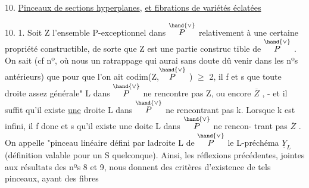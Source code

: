
10. \uline{Pinceaux de sections hyperplanes}, \uline{et fibrations de variétés éclatées}

10. 1. Soit Z l'ensemble P-exceptionnel dans $\overset{\hand{\vee}}{P}$ relativement à une
certaine propriété constructible, de sorte que Z est une partie construc%
tible de $\overset{\hand{\vee}}{P}$ . \hand{(}\hand{)} On sait (cf nº, où nous  un ratrappage
 qui aurai sans doute dû venir dans les nºs antérieurs) que pour que
l'on ait codim(Z,$\overset{\hand{\vee}}{P}$ ) $\geqslant$ 2, il f et s que toute droite assez
générale" L dans $\overset{\hand{\vee}}{P}$ ne rencontre pas Z,  ou encore $\overline{Z}$ , - et il suffit
qu'il existe \uline{une} droite L dans $\overset{\hand{\vee}}{P}$ ne rencontrant pas k. Lorsque 
k est infini, il f donc et s qu'il existe une doite L dans $\overset{\hand{\vee}}{P}$ ne rencon-%
trant pas $\overline{Z}$ . On appelle "pinceau linéaire\hand{(}\hand{)} défini par ladroite
L de $\overset{\hand{\vee}}{P}$\hand{,} le L-préchéma $\underline{Y}_L$ (définition valable pour un S quelconque).
Ainsi, les réflexions précédentes, jointes aux résultats des nºs 8 et 9,
nous donnent des critères d'existence de tels pinceaux, ayant des fibres

